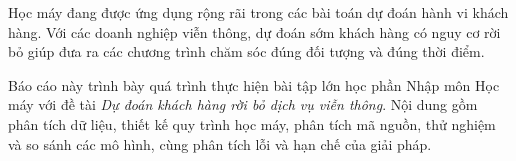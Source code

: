 
Học máy đang được ứng dụng rộng rãi trong các bài toán dự đoán hành vi khách hàng. Với các doanh nghiệp viễn thông,
dự đoán sớm khách hàng có nguy cơ rời bỏ giúp đưa ra các chương trình chăm sóc đúng đối tượng và đúng thời điểm.

Báo cáo này trình bày quá trình thực hiện bài tập lớn học phần Nhập môn Học máy với đề tài
\emph{Dự đoán khách hàng rời bỏ dịch vụ viễn thông}. Nội dung gồm phân tích dữ liệu, thiết kế quy trình học máy,
phân tích mã nguồn, thử nghiệm và so sánh các mô hình, cùng phân tích lỗi và hạn chế của giải pháp.
